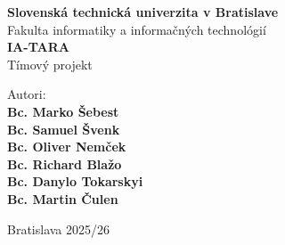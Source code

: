 \begin{titlepage}
    \begin{center}

        {\Large \textbf{Slovenská technická univerzita v Bratislave}}\\[0.3cm]
        {\large Fakulta informatiky a informačných technológií}\\[7cm]

        {\Huge \textbf{IA-TARA}}\\[0.5cm]
        {\Large Tímový projekt}\\[10cm]

        \begin{flushleft}
            \large
            Autori:\\
            \textbf{Bc. Marko Šebest} \\
            \textbf{Bc. Samuel Švenk} \\
            \textbf{Bc. Oliver Nemček} \\
            \textbf{Bc. Richard Blažo} \\
            \textbf{Bc. Danylo Tokarskyi} \\
            \textbf{Bc. Martin Čulen} \\
        \end{flushleft}

        \vfill

        {\large Bratislava \hfill 2025/26}

    \end{center}
\end{titlepage}
